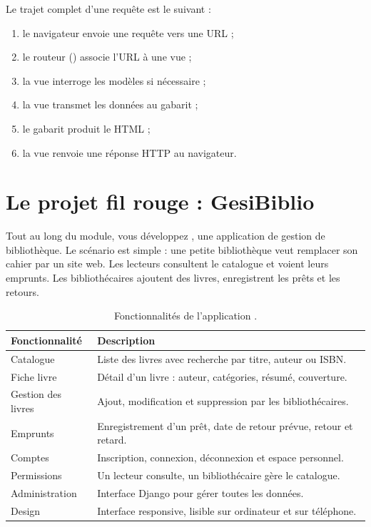 Le trajet complet d'une requête est le suivant :
\begin{enumerate}
  \item le navigateur envoie une requête vers une URL ;
  \item le routeur () associe l'URL à une vue ;
  \item la vue interroge les modèles si nécessaire ;
  \item la vue transmet les données au gabarit ;
  \item le gabarit produit le HTML ;
  \item la vue renvoie une réponse HTTP au navigateur.
\end{enumerate}

\section{Le projet fil rouge : GesiBiblio}

Tout au long du module, vous développez \gesibiblio, une application de gestion de
bibliothèque. Le scénario est simple : une petite bibliothèque veut remplacer son
cahier par un site web. Les lecteurs consultent le catalogue et voient leurs
emprunts. Les bibliothécaires ajoutent des livres, enregistrent les prêts et les
retours.

\begin{table}[htbp]
\centering
\small
\begin{tabularx}{\textwidth}{L{4.2cm} X}
\toprule
\textbf{Fonctionnalité} & \textbf{Description} \\
\midrule
Catalogue & Liste des livres avec recherche par titre, auteur ou ISBN. \\
Fiche livre & Détail d'un livre : auteur, catégories, résumé, couverture. \\
Gestion des livres & Ajout, modification et suppression par les bibliothécaires. \\
Emprunts & Enregistrement d'un prêt, date de retour prévue, retour et retard. \\
Comptes & Inscription, connexion, déconnexion et espace personnel. \\
Permissions & Un lecteur consulte, un bibliothécaire gère le catalogue. \\
Administration & Interface Django pour gérer toutes les données. \\
Design & Interface responsive, lisible sur ordinateur et sur téléphone. \\
\bottomrule
\end{tabularx}
\caption{Fonctionnalités de l'application \gesibiblio.}
\end{table}

